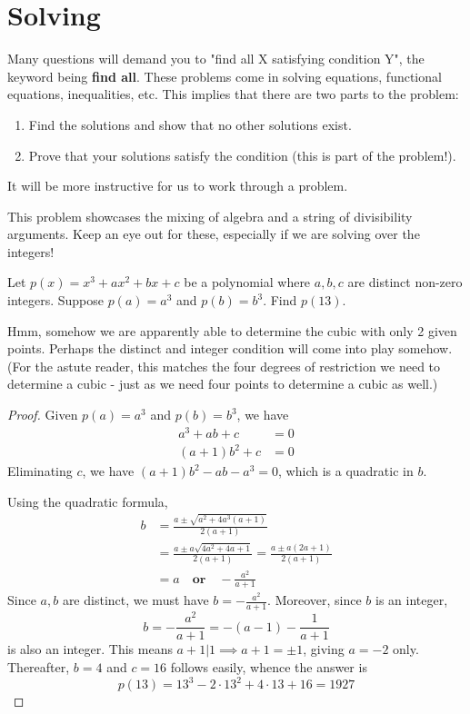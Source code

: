\documentclass[../jarvis.tex]{subfiles}
\begin{document}
\section{Solving}
Many questions will demand you to "find all X satisfying condition Y", the keyword being \textbf{find all}. These problems come in solving equations, functional equations, inequalities, etc. This implies that there are two parts to the problem: 
\begin{enumerate}
    \item Find the solutions and show that no other solutions exist.
    \item Prove that your solutions satisfy the condition (this is part of the problem!).
\end{enumerate}
It will be more instructive for us to work through a problem.

This problem showcases the mixing of algebra and a string of divisibility arguments. Keep an eye out for these, especially if we are solving over the integers!
\begin{example}[2018 SMO(O) P9]
    Let $p(x)=x^3+ax^2+bx+c$ be a polynomial where $a,b,c$ are distinct non-zero integers. Suppose $p(a)=a^3$ and $p(b)=b^3$. Find $p(13)$.
\end{example}
Hmm, somehow we are apparently able to determine the cubic with only 2 given points. Perhaps the distinct and integer condition will come into play somehow. (For the astute reader, this matches the four degrees of restriction we need to determine a cubic - just as we need four points to determine a cubic as well.)
\begin{proof}
    Given $p(a)=a^3$ and $p(b)=b^3$, we have 
    \begin{align*}
        a^3+ab+c&=0\\
        (a+1)b^2+c&=0
    \end{align*}
    Eliminating $c$,
    we have $(a+1)b^2-ab-a^3=0$, which is a quadratic in $b$.
    
    Using the quadratic formula,
    \begin{align*}
        b&=\frac{a\pm \sqrt{a^2+4a^3(a+1)}}{2(a+1)}\\
        &=\frac{a\pm a\sqrt{4a^2+4a+1}}{2(a+1)}=\frac{a\pm a(2a+1)}{2(a+1)} \\
        &=a \quad \textbf{or} \quad -\frac{a^2}{a+1}
    \end{align*}
    Since $a,b$ are distinct, we must have $b=-\frac{a^2}{a+1}.$
    Moreover, since $b$ is an integer, 
    $$b=-\frac{a^2}{a+1}=-(a-1)-\frac{1}{a+1}$$
    is also an integer. This means $a+1|1 \implies a+1=\pm 1$, giving $a=-2$ only. Thereafter, $b=4$ and $c=16$ follows easily, whence the answer is 
    $$p(13)=13^3-2\cdot 13^2+4\cdot 13+16=\boxed{1927}$$
\end{proof}
\end{document}
